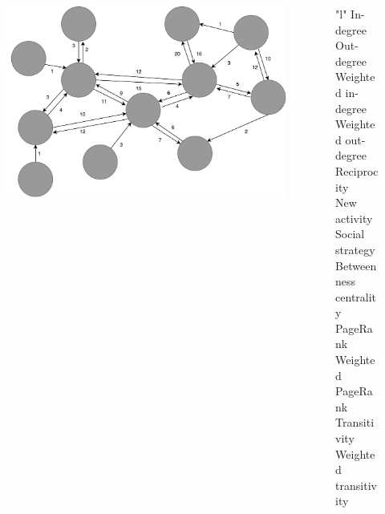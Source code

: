 \begin{frame}
	\begin{columns}
		\begin{column}{0.5\textwidth}
			\begin{figure}
				\includegraphics[scale=0.27]{graphics/directed_network.pdf}
			\end{figure}
		\end{column}
		\begin{column}{0.5\textwidth}
			\begin{table}
				\begin{tabular}{"l"}
				\thinhline
					In-degree				\\ \thinhline
					Out-degree				\\ \thinhline
					Weighted in-degree		\\ \thinhline
					Weighted out-degree		\\ \thinhline
					Reciprocity				\\ \thinhline
					New activity			\\ \thinhline
					Social strategy			\\ \thinhline
					Betweenness centrality	\\ \thinhline
					PageRank				\\ \thinhline
					Weighted PageRank		\\ \thinhline
					Transitivity			\\ \thinhline
					Weighted transitivity 	\\ \thinhline
				\end{tabular}
			\end{table}
		\end{column}
	\end{columns}

\end{frame}

